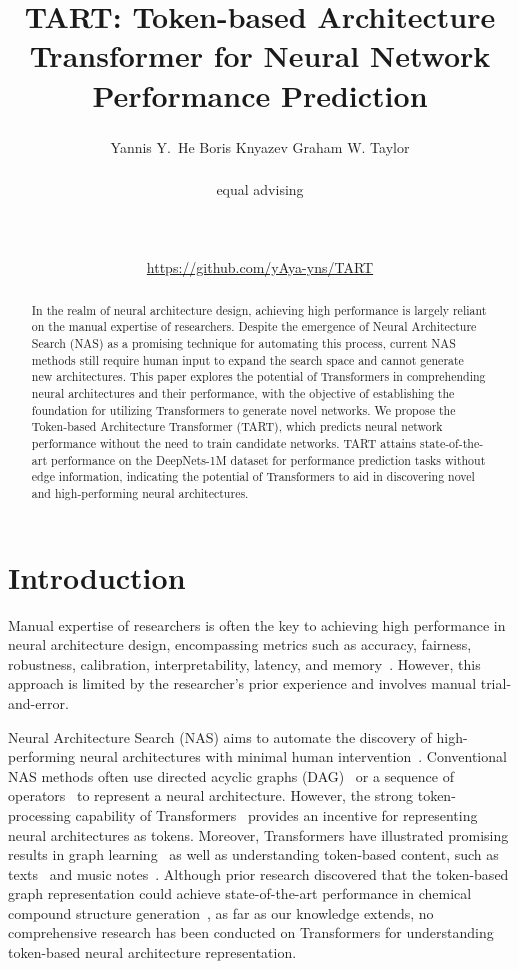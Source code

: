\documentclass{article}
\title{TART: Token-based Architecture Transformer for Neural Network Performance Prediction}
\author{%
    Yannis Y.~He\affmark[1,2]
    \And 
    Boris Knyazev \affmark[3,]\textsuperscript{\textdagger}
    \And
    Graham W. Taylor \affmark[1,4,]\textsuperscript{\textdagger}
    \And \\
  \affaddr{\affmark[1]Vector Institute} \hspace*{0.02 \linewidth}
  \affaddr{\affmark[2]University of Toronto} \hspace*{0.02 \linewidth}
  \affaddr{\affmark[3]Samsung - SAIT AI Lab} \hspace*{0.02 \linewidth}
  \affaddr{\affmark[4]University of Guelph}  \\ 
  \textsuperscript{\textdagger} equal advising \\ \\
  \email{
      \href{mailto:yannis.he@mail.utoronto.ca}{yannis.he@mail.utoronto.ca}, 
      \href{mailto:borknyaz@gmail.com}{borknyaz@gmail.com},
      \href{mailto:graham.taylor@vectorinstitute.ai}{graham.taylor@vectorinstitute.ai}
      }\\ \\
  \color{violet}\url{ https://github.com/yAya-yns/TART}
}
\begin{document}
\maketitle

\begin{abstract}
    In the realm of neural architecture design, achieving high performance is largely reliant on the manual expertise of researchers. Despite the emergence of Neural Architecture Search (NAS) as a promising technique for automating this process, current NAS methods still require human input to expand the search space and cannot generate new architectures. This paper explores the potential of Transformers in comprehending neural architectures and their performance, with the objective of establishing the foundation for utilizing Transformers to generate novel networks. We propose the Token-based Architecture Transformer (TART), which predicts neural network performance without the need to train candidate networks. TART attains state-of-the-art performance on the DeepNets-1M dataset for performance prediction tasks without edge information, indicating the potential of Transformers to aid in discovering novel and high-performing neural architectures.
\end{abstract}


\section{Introduction}
Manual expertise of researchers is often the key to achieving high performance in neural architecture design, encompassing metrics such as accuracy, fairness, robustness, calibration, interpretability, latency, and memory~\cite{hutter}. However, this approach is limited by the researcher's prior experience and involves manual trial-and-error.

Neural Architecture Search (NAS) aims to automate the discovery of high-performing neural architectures with minimal human intervention~\cite{ren_xiao_chang_huang_li_chen_wang_2021}. Conventional NAS methods often use directed acyclic graphs (DAG)~\cite{liu_simonyan_yang_2019} or a sequence of operators~\cite{luo_tian_qin_chen_liu_2019} to represent a neural architecture. However, the strong token-processing capability of Transformers~\cite{attentionIsAllYouNeed} provides an incentive for representing neural architectures as tokens. Moreover, Transformers have illustrated promising results in graph learning~\cite{kim_nguyen_min_cho_lee_lee_hong_2022} as well as understanding token-based content, such as texts~\cite{zhang_song_li_zhou_song_2022} and music notes~\cite{huang_vaswani_uszkoreit_shazeer_simon_hawthorne_dai_hoffman_dinculescu_eck_et_al._2018}. Although prior research discovered that the token-based graph representation could achieve state-of-the-art performance in chemical compound structure generation~\cite{krenn_häse_nigam_friederich_aspuru-guzik_2020}, as far as our knowledge extends, no comprehensive research has been conducted on Transformers for understanding token-based neural architecture representation.  
\end{document}
